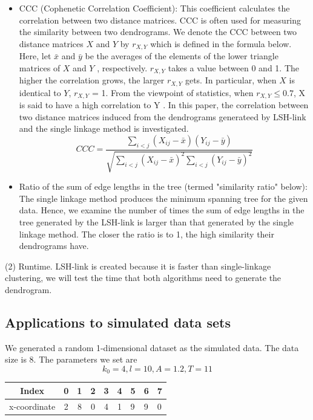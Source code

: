 \documentclass{report}
\begin{document}
\begin{itemize}
\item CCC (Cophenetic Correlation Coefficient): This coefficient calculates the correlation between two distance matrices. CCC is often used for measuring the similarity between two dendrograms. We denote the CCC between two distance matrices $X$ and $Y$ by $r_{X,Y}$ which is defined in the formula below. Here, let $\bar{x}$ and $\bar{y}$ be the averages of the elements of the lower triangle matrices of $X$ and $Y$ , respectively. $r_{X,Y}$ takes a value between 0 and 1. The higher the correlation grows, the larger $r_{X,Y}$ gets. In particular, when $X$ is identical to $Y$, $r_{X,Y}$ = 1. From the viewpoint of statistics, when $r_{X,Y} \leq 0.7$, X is said to have a high correlation to Y . In this paper, the correlation between two distance matrices induced from the dendrograms generateed by LSH-link and the single linkage method is investigated.
$$CCC = \frac{\sum_{i<j}(X_{ij}-\bar{x})(Y_{ij}-\bar{y})}{\sqrt{\sum_{i<j}(X_{ij}-\bar{x})^2\sum_{i<j}(Y_{ij}-\bar{y})^2}}$$
\item Ratio of the sum of edge lengths in the tree (termed "similarity ratio" below): The single linkage method produces the minimum spanning tree for the given data. Hence, we examine the number of times the sum of edge lengths in the tree generated by the LSH-link is larger than that generated by the single linkage method. The closer the ratio is to 1, the high similarity their dendrograms have.
\end{itemize}

(2) Runtime. LSH-link is created because it is faster than single-linkage clustering, we will test the time that both algorithms need to generate the dendrogram.
\subsection*{Applications to simulated data sets} 
We generated a random 1-dimensional dataset as the simulated data.  The data size is 8. The parameters we set are $$k_0 = 4, l = 10, A = 1.2, T = 11$$
\begin{table}[H]
\centering
\begin{tabular}{cccccclll}
\hline
Index & 0 & 1 & 2 & 3 & 4 & 5 & 6 & 7 \\ \hline
x-coordinate & 2 & 8 & 0 & 4 & 1 & 9 & 9 & 0 \\ \hline
\end{tabular}
\end{table}
\end{document}
